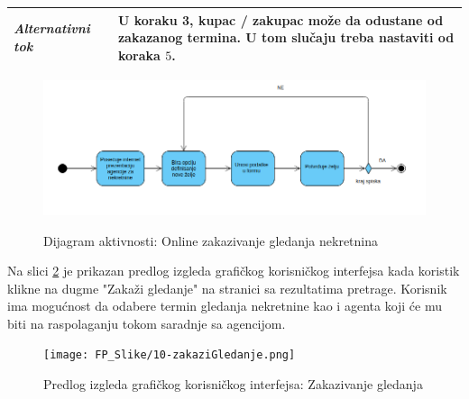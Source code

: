 \documentclass[20pt]{article}
\begin{document}
\begin{center}
\begin{longtable}{p{0.23\linewidth} p{0.77\linewidth}}
 {\it \bfseries Alternativni tok} & U koraku 3, kupac / zakupac mo\v ze da odustane od zakazanog termina. U tom slu\v caju treba nastaviti od koraka $5$.\\
 \hline
 
\end{longtable}
\end{center}

\begin{figure}[h]
        \centering
        \includegraphics[width=1.1\textwidth,height=0.35\textheight] {Pictures/DijagramAktivnostiOnlineZakazivanjeGledanja.png}\\
        \caption{Dijagram aktivnosti: Online zakazivanje gledanja nekretnina}
        \label{fig:dijagramAktivnostiOnlineZakazivanjeGledanja}
    \end{figure}

Na slici \ref{fig:guiZakaziGledanje} je prikazan predlog izgleda grafi\v ckog korisni\v ckog interfejsa kada koristik klikne na dugme "Zaka\v zi gledanje" na stranici sa rezultatima pretrage. Korisnik ima mogu\' cnost da odabere termin gledanja nekretnine kao i agenta koji \' ce mu biti na raspolaganju tokom saradnje sa agencijom.

\begin{figure}[h]
        \centering
        \texttt{[image: FP\_Slike/10-zakaziGledanje.png]}\\
        \caption{Predlog izgleda grafi\v ckog korisni\v ckog interfejsa: Zakazivanje gledanja}
        \label{fig:guiZakaziGledanje}
    \end{figure}

\newpage
{}
\setlength{\parindent}{1cm}
\fontsize{13}{18} \selectfont 
\end{document}

